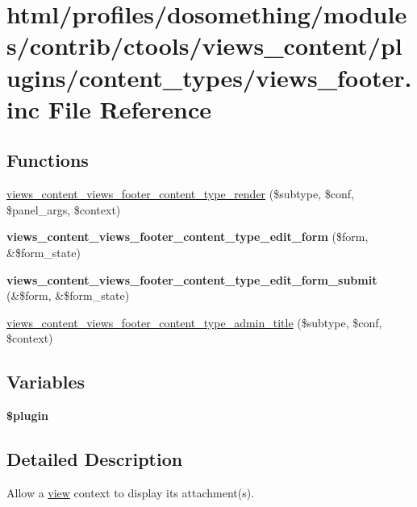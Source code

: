 \hypertarget{views__footer_8inc}{
\section{html/profiles/dosomething/modules/contrib/ctools/views\_\-content/plugins/content\_\-types/views\_\-footer.inc File Reference}
\label{views__footer_8inc}
}
\subsection*{Functions}
\begin{DoxyCompactItemize}
\item 
\hyperlink{views__footer_8inc_a8e03dd3548aa636686b34c1ef017102e}{views\_\-content\_\-views\_\-footer\_\-content\_\-type\_\-render} (\$subtype, \$conf, \$panel\_\-args, \$context)
\item 
\hypertarget{views__footer_8inc_a99b630ca8b4856629021534a781ae175}{
{\bfseries views\_\-content\_\-views\_\-footer\_\-content\_\-type\_\-edit\_\-form} (\$form, \&\$form\_\-state)}
\label{views__footer_8inc_a99b630ca8b4856629021534a781ae175}

\item 
\hypertarget{views__footer_8inc_a90ae4081ee4cdbeafef9562edd670bf2}{
{\bfseries views\_\-content\_\-views\_\-footer\_\-content\_\-type\_\-edit\_\-form\_\-submit} (\&\$form, \&\$form\_\-state)}
\label{views__footer_8inc_a90ae4081ee4cdbeafef9562edd670bf2}

\item 
\hyperlink{views__footer_8inc_ac8cb9d36181f7d855506a347de3f5b7c}{views\_\-content\_\-views\_\-footer\_\-content\_\-type\_\-admin\_\-title} (\$subtype, \$conf, \$context)
\end{DoxyCompactItemize}
\subsection*{Variables}
\begin{DoxyCompactItemize}
\item 
{\bfseries \$plugin}
\end{DoxyCompactItemize}


\subsection{Detailed Description}
Allow a \hyperlink{classview}{view} context to display its attachment(s). 

